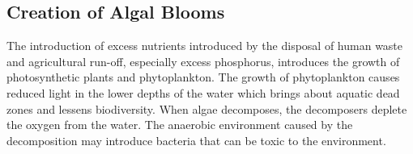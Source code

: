 \documentclass{article}
\begin{document}
    \subsection{Creation of Algal Blooms}
        The introduction of excess nutrients introduced by the disposal of human waste and agricultural run-off, especially excess phosphorus, introduces the growth of photosynthetic plants and phytoplankton.
        The growth of phytoplankton causes reduced light in the lower depths of the water which brings about aquatic dead zones and lessens biodiversity. When algae decomposes, the decomposers deplete the oxygen from the water.
        The anaerobic environment caused by the decomposition may introduce bacteria that can be toxic to the environment.\cite{china,china2}
\newpage
\printbibliography[heading=bibintoc]
\end{document}
